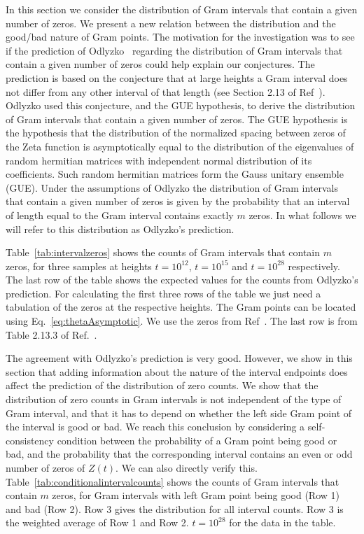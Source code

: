 \documentclass[twoside]{article}
\theoremstyle{definition}
\begin{document}
In this section we consider the distribution of Gram intervals that contain a given number of zeros. We present a new relation between the distribution and the good/bad nature of Gram points. 
The motivation for the investigation was to see if 
 the prediction of Odlyzko~\cite{Odlyzko 1992} regarding the distribution of Gram intervals that contain a given number of zeros could help explain our conjectures. The prediction is based on the conjecture that at large heights a Gram interval does not differ from any other interval of that length (see Section 2.13 of Ref~\cite{Odlyzko 1992}). Odlyzko used this conjecture, and the GUE hypothesis, to derive the distribution of Gram intervals that contain a given number of zeros.  
The GUE hypothesis  is the hypothesis that the distribution of the normalized spacing between zeros of the Zeta function is asymptotically equal to the distribution of the eigenvalues of random hermitian matrices with independent normal distribution of its coefficients. Such random hermitian matrices form the Gauss unitary ensemble (GUE). Under the assumptions of Odlyzko the distribution of Gram intervals that contain a given number of zeros is given by the probability that an interval of length equal to the Gram interval contains exactly $m$ zeros. In what follows we will refer to this distribution as Odlyzko's prediction.

Table~\ref{tab:intervalzeros} shows the counts of Gram intervals that contain $m$ zeros, for three samples at heights $t=10^{12}$, $t=10^{15}$  and $t=10^{28}$ respectively. The last row of the table shows the  expected values for the counts from Odlyzko's prediction. For calculating the first three rows of the table we just need a tabulation of the zeros at the respective heights. The Gram points can be located using Eq.~\ref{eq:thetaAsymptotic}. We use the zeros from Ref~\cite{hiary 2010}. The last row is from Table 2.13.3 of Ref.~\cite{Odlyzko 1992}.

The agreement with Odlyzko's prediction is very good. However, we show in this section that adding information about the nature of the interval endpoints does affect the prediction of the
distribution of zero counts. We show that the distribution of zero counts in Gram intervals is not independent of the type of Gram interval, and that it has to depend on whether the left side Gram point of the interval is good or bad. We reach this conclusion by considering a self-consistency condition between the probability of a Gram point being good or bad, and the probability that the corresponding interval contains an even or odd number of zeros of $Z(t)$.  We can also directly verify this. Table~\ref{tab:conditionalintervalcounts} shows the counts of Gram intervals that contain $m$ zeros, for Gram intervals with left Gram point being good (Row 1) and bad (Row 2). Row 3 gives
the distribution for all interval counts. Row 3 is the weighted average of Row 1 and Row 2. $t=10^{28}$ for the data in the table.
\end{document}
